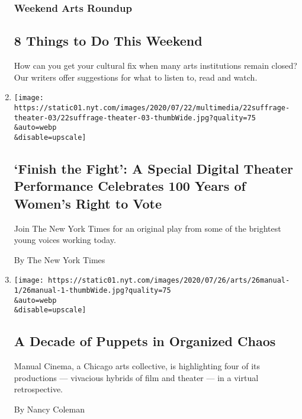 \begin{enumerate}
  \hypertarget{weekend-arts-roundup}{%
  \subsubsection{Weekend Arts Roundup}\label{weekend-arts-roundup}}

  \hypertarget{8-things-to-do-this-weekend}{%
  \subsection{8 Things to Do This
  Weekend}\label{8-things-to-do-this-weekend}}

  How can you get your cultural fix when many arts institutions remain
  closed? Our writers offer suggestions for what to listen to, read and
  watch.
\item
  \href{/2020/07/23/theater/finish-the-fight-suffrage-centennial-performance.html}{}

  \texttt{[image: https://static01.nyt.com/images/2020/07/22/multimedia/22suffrage-theater-03/22suffrage-theater-03-thumbWide.jpg?quality=75\\\&auto=webp\\\&disable=upscale]}

  \hypertarget{finish-the-fight-a-special-digital-theater-performance-celebrates-100-years-of-womens-right-to-vote}{%
  \subsection{`Finish the Fight': A Special Digital Theater Performance
  Celebrates 100 Years of Women's Right to
  Vote}\label{finish-the-fight-a-special-digital-theater-performance-celebrates-100-years-of-womens-right-to-vote}}

  Join The New York Times for an original play from some of the
  brightest young voices working today.

  By The New York Times
\item
  \href{/2020/07/23/theater/manual-cinema-puppets-retrospective.html}{}

  \texttt{[image: https://static01.nyt.com/images/2020/07/26/arts/26manual-1/26manual-1-thumbWide.jpg?quality=75\\\&auto=webp\\\&disable=upscale]}

  \hypertarget{a-decade-of-puppets-in-organized-chaos}{%
  \subsection{A Decade of Puppets in Organized
  Chaos}\label{a-decade-of-puppets-in-organized-chaos}}

  Manual Cinema, a Chicago arts collective, is highlighting four of its
  productions --- vivacious hybrids of film and theater --- in a virtual
  retrospective.

  By Nancy Coleman
\end{enumerate}

